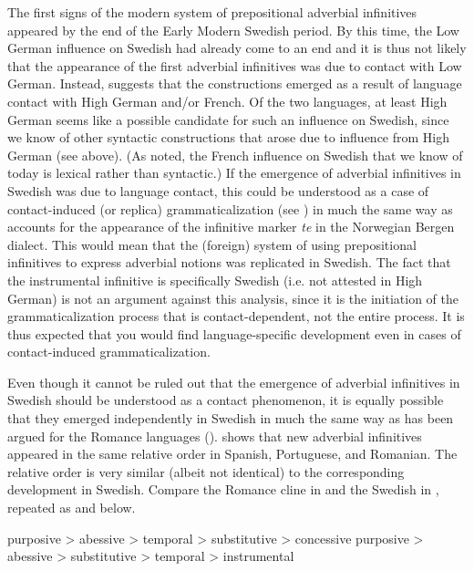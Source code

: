 \documentclass[output=paper]{langscibook}
\begin{document}
The first signs of the modern system of prepositional adverbial infinitives appeared by the end of the Early Modern Swedish period. By this time, the Low German influence on Swedish had already come to an end and it is thus not likely that the appearance of the first adverbial infinitives was due to contact with Low German. Instead, \citet{Holm1967} suggests that the constructions emerged as a result of language contact with High German and/or French. Of the two languages, at least High German seems like a possible candidate for such an influence on Swedish, since we know of other syntactic constructions that arose due to influence from High German (see  above). (As noted, the French influence on Swedish that we know of today is lexical rather than syntactic.) If the emergence of adverbial infinitives in Swedish was due to language contact, this could be understood as a case of contact-induced (or replica) grammaticalization (see \citealt{HeineKuteva2003, HeineKuteva2005}) in much the same way as \citet{Nesse2002} accounts for the appearance of the infinitive marker \textit{te} in the Norwegian Bergen dialect. This would mean that the (foreign) system of using prepositional infinitives to express adverbial notions was replicated in Swedish. The fact that the instrumental infinitive is specifically Swedish (i.e. not attested in High German) is not an argument against this analysis, since it is the initiation of the grammaticalization process that is contact-dependent, not the entire process. It is thus expected that you would find language-specific development even in cases of contact-induced grammaticalization. 



Even though it cannot be ruled out that the emergence of adverbial infinitives in Swedish should be understood as a contact phenomenon, it is equally possible that they emerged independently in Swedish in much the same way as has been argued for the Romance languages (\citealt{Schulte2007Prepositional, Schulte2007What}). \citet{Schulte2007Prepositional, Schulte2007What} shows that new adverbial infinitives appeared in the same relative order in Spanish, Portuguese, and Romanian. The relative order is very similar (albeit not identical) to the corresponding development in Swedish. Compare the Romance cline in  and the Swedish in , repeated as  and  below. 

\ea
\label{ex:kalm:31}
purposive > abessive > temporal > substitutive > concessive
\ex
\label{ex:kalm:32}
purposive > abessive > substitutive > temporal > instrumental
\z
\end{document}
